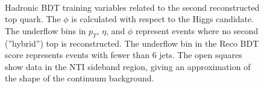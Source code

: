 \begin{figure}[htbp]
  \centering
	 \\
  \caption{Hadronic BDT training variables related to the second reconstructed top quark. The $\phi$ is calculated with respect to the Higgs candidate. The underflow bins in $p_{T}$, $\eta$, and $\phi$ represent events where no second (''hybrid'') top is reconstructed. The underflow bin in the Reco BDT score represents events with fewer than 6 jets.  The open squares show data in the NTI sideband region, giving an approximation of the shape of the continuum background. }
  \label{fig:hadvbls3}
\end{figure}

